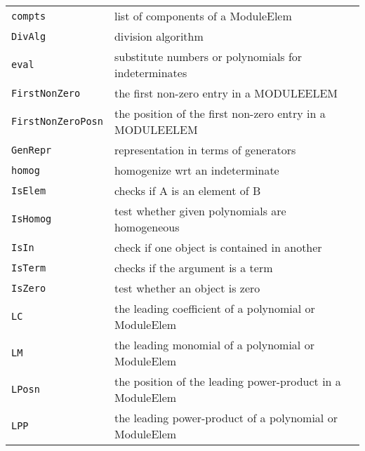\documentclass[a4paper]{mybook}
\begin{document}
\begin{center}
\begin{longtable}{ll}
   
{\verb~compts~} &
      list of components of a ModuleElem\\
   
{\verb~DivAlg~} &
      division algorithm\\
   
{\verb~eval~} &
      substitute numbers or polynomials for indeterminates\\
   
{\verb~FirstNonZero~} &
      the first non-zero entry in a MODULEELEM\\
   
{\verb~FirstNonZeroPosn~} &
      the position of the first non-zero entry in a MODULEELEM\\
   
{\verb~GenRepr~} &
      representation in terms of generators\\
   
{\verb~homog~} &
      homogenize wrt an indeterminate\\
   
{\verb~IsElem~} &
      checks if A is an element of B\\
   
{\verb~IsHomog~} &
      test whether given polynomials are homogeneous\\
   
{\verb~IsIn~} &
      check if one object is contained in another\\
   
{\verb~IsTerm~} &
      checks if the argument is a term\\
   
{\verb~IsZero~} &
      test whether an object is zero\\
   
{\verb~LC~} &
      the leading coefficient of a polynomial or ModuleElem\\
   
{\verb~LM~} &
      the leading monomial of a polynomial or ModuleElem\\
   
{\verb~LPosn~} &
      the position of the leading power-product in a ModuleElem\\
   
{\verb~LPP~} &
      the leading power-product of a polynomial or ModuleElem\\
   

\end{longtable}
\end{center}
\end{document}

